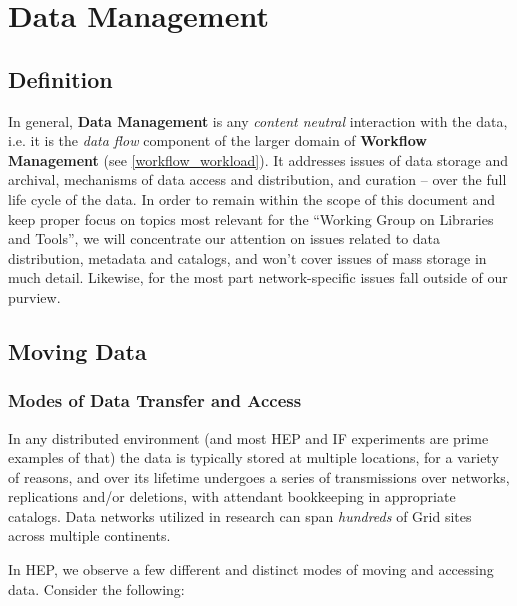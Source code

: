 \section{Data Management}
\label{data}


\subsection{Definition}
In general, \textbf{Data Management} is any \textit{content neutral} interaction with the data, i.e. it is the \textit{data flow}
component of the larger domain of  \textbf{Workflow Management} (see \ref{workflow_workload}). It addresses issues of data storage
and archival, mechanisms of data access and distribution, and  curation -- over the full life cycle of the data. In order to remain within
the scope of this document and keep  proper focus on topics most relevant for the ``Working Group on Libraries and Tools'', we will
concentrate our attention on issues related to data distribution, metadata and catalogs, and won't cover issues of mass storage
in much detail. Likewise, for the most part network-specific issues fall outside of our purview.



\subsection{Moving Data}
\subsubsection{Modes of Data Transfer and Access}
In any distributed environment (and most HEP and IF experiments are prime examples of that) the data is typically stored at multiple locations,
for a variety of reasons, and over its lifetime undergoes a series of transmissions over networks, replications and/or deletions, with attendant bookkeeping
in appropriate catalogs. Data networks utilized in research can span \textit{hundreds} of Grid sites across multiple continents.

In HEP, we observe a few different and distinct modes of moving and accessing data. Consider the following:

